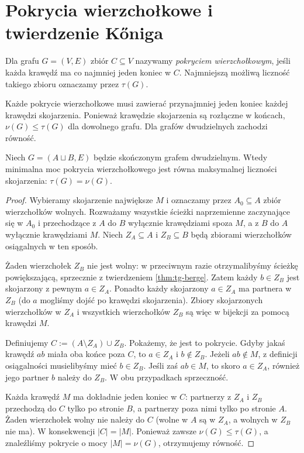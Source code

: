 \section{Pokrycia wierzchołkowe i twierdzenie Kőniga}
\label{sec:tg-konig}

\begin{definicja}
Dla grafu $G=(V,E)$ zbiór $C\subseteq V$ nazywamy
\emph{pokryciem wierzchołkowym}, jeśli każda krawędź
ma co najmniej jeden koniec w $C$.
Najmniejszą możliwą liczność takiego zbioru
oznaczamy przez $\tau(G)$.
\end{definicja}

Każde pokrycie wierzchołkowe musi zawierać przynajmniej
jeden koniec każdej krawędzi skojarzenia. Ponieważ
krawędzie skojarzenia są rozłączne w końcach,
$\nu(G)\le\tau(G)$ dla dowolnego grafu. Dla grafów
dwudzielnych zachodzi równość.

\begin{twierdzenie}[Kőnig]
\label{thm:tg-konig}
Niech $G=(A\sqcup B,E)$ będzie skończonym grafem
dwudzielnym. Wtedy minimalna moc pokrycia
wierzchołkowego jest równa maksymalnej liczności
skojarzenia: $\tau(G)=\nu(G)$.
\end{twierdzenie}

\begin{proof}
Wybieramy skojarzenie największe $M$ i oznaczamy
przez $A_0\subseteq A$ zbiór wierzchołków wolnych.
Rozważamy wszystkie ścieżki naprzemienne zaczynające
się w $A_0$ i przechodzące z $A$ do $B$ wyłącznie
krawędziami spoza $M$, a z $B$ do $A$ wyłącznie
krawędziami $M$. Niech $Z_A\subseteq A$ i $Z_B\subseteq B$
będą zbiorami wierzchołków osiągalnych w ten sposób.

Żaden wierzchołek $Z_B$ nie jest wolny: w przeciwnym
razie otrzymalibyśmy ścieżkę powiększającą,
sprzecznie z twierdzeniem \ref{thm:tg-berge}.
Zatem każdy $b\in Z_B$ jest skojarzony z pewnym
$a\in Z_A$. Ponadto każdy skojarzony $a\in Z_A$
ma partnera w $Z_B$ (do $a$ mogliśmy dojść
po krawędzi skojarzenia). Zbiory skojarzonych
wierzchołków w $Z_A$ i wszystkich wierzchołków
$Z_B$ są więc w bijekcji za pomocą krawędzi $M$.

Definiujemy $C:=(A\setminus Z_A)\cup Z_B$.
Pokażemy, że jest to pokrycie. Gdyby jakaś
krawędź $ab$ miała oba końce poza $C$,
to $a\in Z_A$ i $b\notin Z_B$.
Jeżeli $ab\notin M$, z definicji osiągalności
musielibyśmy mieć $b\in Z_B$. Jeśli zaś $ab\in M$,
to skoro $a\in Z_A$, również jego partner $b$
należy do $Z_B$. W obu przypadkach sprzeczność.

Każda krawędź $M$ ma dokładnie jeden koniec w $C$:
partnerzy z $Z_A$ i $Z_B$ przechodzą do $C$ tylko
po stronie $B$, a partnerzy poza nimi tylko po
stronie $A$. Żaden wierzchołek wolny nie należy
do $C$ (wolne w $A$ są w $Z_A$, a wolnych
w $Z_B$ nie ma). W konsekwencji $|C|=|M|$.
Ponieważ zawsze $\nu(G)\le\tau(G)$, a znaleźliśmy
pokrycie o mocy $|M|=\nu(G)$, otrzymujemy równość.
\end{proof}

